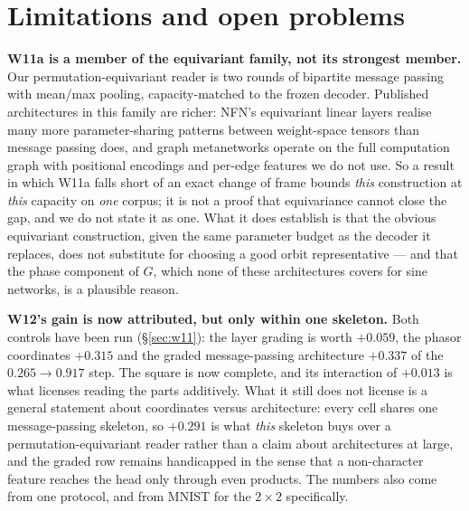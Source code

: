 \documentclass[10pt,twocolumn,letterpaper]{article}
\theoremstyle{definition}
\begin{document}
\section{Limitations and open problems}\label{sec:limits}

\textbf{W11a is a member of the equivariant family, not its strongest member.} Our
permutation-equivariant reader is two rounds of bipartite message passing with mean/max pooling,
capacity-matched to the frozen decoder. Published architectures in this family are richer: NFN's
equivariant linear layers realise many more parameter-sharing patterns between weight-space
tensors than message passing does, and graph metanetworks operate on the full computation graph
with positional encodings and per-edge features we do not use. So a result in which W11a falls
short of an exact change of frame bounds \emph{this} construction at \emph{this} capacity on
\emph{one} corpus; it is not a proof that equivariance cannot close the gap, and we do not state it
as one. What it does establish is that the obvious equivariant construction, given the same
parameter budget as the decoder it replaces, does not substitute for choosing a good orbit
representative --- and that the phase component of $G$, which none of these architectures covers
for sine networks, is a plausible reason.

\textbf{W12's gain is now attributed, but only within one skeleton.} Both controls have been run
(\S\ref{sec:w11}): the layer grading is worth $+0.059$, the phasor coordinates $+0.315$ and the
graded message-passing architecture $+0.337$ of the $0.265 \to 0.917$ step. The square is now complete, and its interaction of $+0.013$ is what licenses reading the
parts additively. What it still does not license is a general statement about coordinates versus
architecture: every cell shares one message-passing skeleton, so $+0.291$ is what \emph{this}
skeleton buys over a permutation-equivariant reader rather than a claim about architectures at
large, and the graded row remains handicapped in the sense that a non-character feature reaches the
head only through even products. The numbers also come from one protocol, and from MNIST for the
$2\times2$ specifically.
\end{document}
